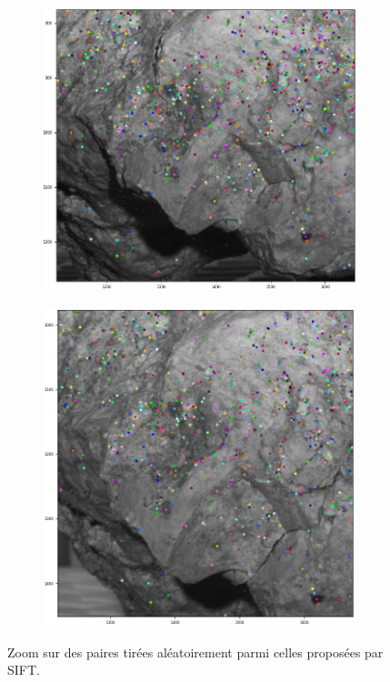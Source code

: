 \documentclass[
	a4paper, %
	10pt, %
	unnumberedsections, %
	twoside, %
]{LTJournalArticle}
\begin{document}
\begin{figure}
	\centering
	\begin{subfigure}[H]{0.45\textwidth}
		\centering
		\includegraphics[width=\textwidth]{images/irl_sift_z1_g.png}
	\end{subfigure}
	\hfill
	\begin{subfigure}[H]{0.45\textwidth}
		\centering
		\includegraphics[width=\textwidth]{images/irl_sift_z1_d.png}
	\end{subfigure}
	\caption{Zoom sur des paires tirées aléatoirement parmi celles proposées par SIFT.}
	\label{figure:fig_irl_sift}
\end{figure}
\end{document}

